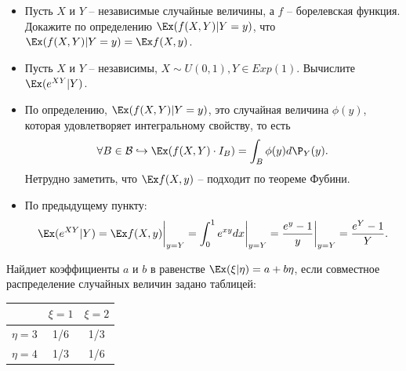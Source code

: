 \begin{problem} \leavevmode
    \begin{itemize}
        \item Пусть $X$ и $Y$ -- независимые случайные величины, а $f$ -- борелевская функция.
        Докажите по определению $\Ex(f(X, Y)|Y = y)$, что $\Ex(f(X, Y)|Y = y) = \Ex f(X, y)$.
        \item Пусть $X$ и $Y$ -- независимы, $X \sim U(0, 1), Y \in Exp(1)$.
        Вычислите $\Ex(e^{XY}|Y)$.
    \end{itemize}
\end{problem}
\begin{solution} \leavevmode
    \begin{itemize}
        \item По определению, $\Ex(f(X, Y)|Y = y)$, это случайная величина $\phi(y)$, которая удовлетворяет интегральному свойству, то есть
        \[
            \forall B \in \mathcal{B} \hookrightarrow \Ex(f(X, Y) \cdot I_B) = \int_B \phi(y)d\P_Y(y).
        \]
        Нетрудно заметить, что $\Ex f(X, y)$ -- подходит по теореме Фубини.
        \item По предыдущему пункту: \[\Ex(e^{XY}|Y) = \Ex f(X, y)\biggr|_{y = Y} = \int_{0}^{1}e^{xy}dx\biggr|_{y = Y} = \dfrac{e^y - 1}{y}\biggr|_{y = Y} = \dfrac{e^{Y} - 1}{Y}.\]
    \end{itemize}
\end{solution}
\begin{problem}
    Найдиет коэффициенты $a$ и $b$ в равенстве $\Ex(\xi |\eta) = a + b \eta$, если совместное распределение случайных величин задано таблицей:
    \begin{table}[h!]
        \centering
        \begin{tabular}{|c|c|c|} \hline
            & $\xi = 1$ & $\xi = 2$ \\ \hline
            $\eta = 3$ & 1/6 & 1/3 \\ \hline
            $\eta = 4$ & 1/3 & 1/6 \\ \hline
        \end{tabular}
    \end{table}
\end{problem}
